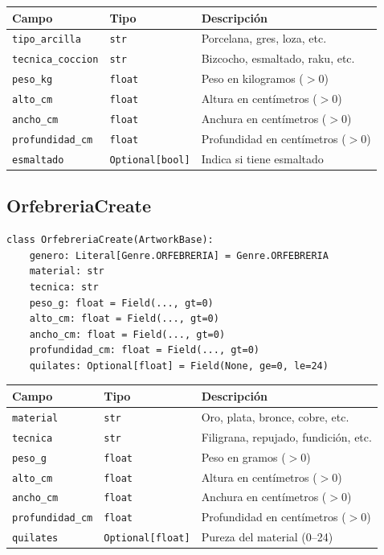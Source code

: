 \documentclass[12pt,a4paper]{article}
\begin{document}
\begin{center}
\begin{tabular}{lll}
\toprule
\textbf{Campo} & \textbf{Tipo} & \textbf{Descripción} \\
\midrule
\texttt{tipo\_arcilla} & \texttt{str} & Porcelana, gres, loza, etc. \\
\texttt{tecnica\_coccion} & \texttt{str} & Bizcocho, esmaltado, raku, etc. \\
\texttt{peso\_kg} & \texttt{float} & Peso en kilogramos ($>0$) \\
\texttt{alto\_cm} & \texttt{float} & Altura en centímetros ($>0$) \\
\texttt{ancho\_cm} & \texttt{float} & Anchura en centímetros ($>0$) \\
\texttt{profundidad\_cm} & \texttt{float} & Profundidad en centímetros ($>0$) \\
\texttt{esmaltado} & \texttt{Optional[bool]} & Indica si tiene esmaltado \\
\bottomrule
\end{tabular}
\end{center}

\subsection{OrfebreriaCreate}

\begin{lstlisting}
class OrfebreriaCreate(ArtworkBase):
    genero: Literal[Genre.ORFEBRERIA] = Genre.ORFEBRERIA
    material: str
    tecnica: str
    peso_g: float = Field(..., gt=0)
    alto_cm: float = Field(..., gt=0)
    ancho_cm: float = Field(..., gt=0)
    profundidad_cm: float = Field(..., gt=0)
    quilates: Optional[float] = Field(None, ge=0, le=24)
\end{lstlisting}

\begin{center}
\begin{tabular}{lll}
\toprule
\textbf{Campo} & \textbf{Tipo} & \textbf{Descripción} \\
\midrule
\texttt{material} & \texttt{str} & Oro, plata, bronce, cobre, etc. \\
\texttt{tecnica} & \texttt{str} & Filigrana, repujado, fundición, etc. \\
\texttt{peso\_g} & \texttt{float} & Peso en gramos ($>0$) \\
\texttt{alto\_cm} & \texttt{float} & Altura en centímetros ($>0$) \\
\texttt{ancho\_cm} & \texttt{float} & Anchura en centímetros ($>0$) \\
\texttt{profundidad\_cm} & \texttt{float} & Profundidad en centímetros ($>0$) \\
\texttt{quilates} & \texttt{Optional[float]} & Pureza del material (0--24) \\
\bottomrule
\end{tabular}
\end{center}
\end{document}
